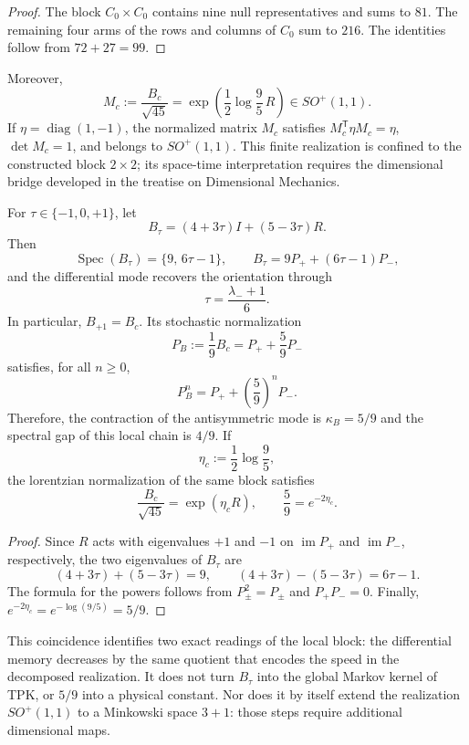 \begin{proof}
The block \(C_0\times C_0\) contains nine null representatives and sums to
\(81\). The remaining four arms of the rows and columns of \(C_0\)
sum to \(216\). The identities follow from \(72+27=99\).
\end{proof}

Moreover,
\[
M_c:=\frac{B_c}{\sqrt{45}}
=\exp\left(\frac12\log\frac95\,R\right)
\in SO^+(1,1).
\]
If \(\eta=\operatorname{diag}(1,-1)\), the normalized matrix \(M_c\) satisfies
\(M_c^{\mathsf T}\eta M_c=\eta\), \(\det M_c=1\), and belongs to
\(SO^+(1,1)\). This finite realization is confined to the constructed block \(2\times2\);
its space-time interpretation requires the dimensional bridge
developed in the treatise on Dimensional Mechanics.

\begin{proposition}
\label{prop:app-trit-espectral-markov-lorentz-rev8}
For \(\tau\in\{-1,0,+1\}\), let
\[
 B_\tau=(4+3\tau)I+(5-3\tau)R.
\]
Then
\[
 \operatorname{Spec}(B_\tau)=\{9,\,6\tau-1\},
 \qquad
 B_\tau=9P_++(6\tau-1)P_-,
\]
and the differential mode recovers the orientation through
\[
 \tau=\frac{\lambda_-+1}{6}.
\]
In particular, \(B_{+1}=B_c\). Its stochastic normalization
\[
 P_B:=\frac{1}{9}B_c=P_++\frac59P_-
\]
satisfies, for all \(n\geq0\),
\[
 P_B^n=P_++\left(\frac59\right)^n P_-.
\]
Therefore, the contraction of the antisymmetric mode is
\(\kappa_B=5/9\) and the spectral gap of this local chain is \(4/9\).
If
\[
 \eta_c:=\frac12\log\frac95,
\]
the lorentzian normalization of the same block satisfies
\[
 \frac{B_c}{\sqrt{45}}=\exp(\eta_c R),
 \qquad
 \boxed{\frac59=e^{-2\eta_c}}.
\]
\end{proposition}

\begin{proof}
Since \(R\) acts with eigenvalues \(+1\) and \(-1\) on
\(\operatorname{im}P_+\) and \(\operatorname{im}P_-\), respectively, the
two eigenvalues of \(B_\tau\) are
\[
 (4+3\tau)+(5-3\tau)=9,\qquad
 (4+3\tau)-(5-3\tau)=6\tau-1.
\]
The formula for the powers follows from
\(P_\pm^2=P_\pm\) and \(P_+P_-=0\). Finally,
\(e^{-2\eta_c}=e^{-\log(9/5)}=5/9\).
\end{proof}

This coincidence identifies two exact readings of the local block: the
differential memory decreases by the same quotient that encodes the speed
in the decomposed realization. It does not turn \(B_\tau\) into the global
Markov kernel of TPK, or \(5/9\) into a physical constant. Nor does it by
itself extend the realization \(SO^+(1,1)\) to a Minkowski space
\(3+1\): those steps require additional dimensional maps.

